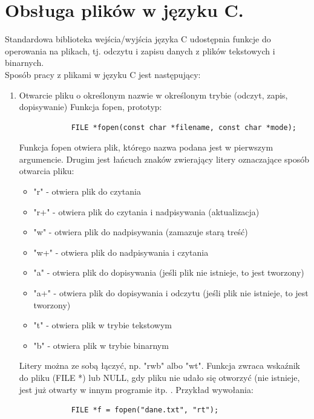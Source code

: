 \documentclass[12pt]{article}
\begin{document}
    \newpage

    \section{Obsługa plików w języku C.}

    Standardowa biblioteka wejścia/wyjścia języka C udostępnia funkcje do operowania na plikach, tj.
    odczytu i zapisu danych z plików tekstowych i binarnych.\\

    Sposób pracy z plikami w języku C jest następujący:
    \begin{enumerate}
        \item Otwarcie pliku o określonym nazwie w określonym trybie (odczyt, zapis, dopisywanie)
        Funkcja fopen, prototyp:
        \begin{verbatim}
            FILE *fopen(const char *filename, const char *mode);
        \end{verbatim}
        Funkcja fopen otwiera plik, którego nazwa podana jest w pierwszym argumencie. Drugim jest
        łańcuch znaków zwierający litery oznaczające sposób otwarcia pliku:
        \begin{itemize}
            \item "r" - otwiera plik do czytania
            \item "r+" - otwiera plik do czytania i nadpisywania (aktualizacja)
            \item "w" - otwiera plik do nadpisywania (zamazuje starą treść)
            \item "w+" - otwiera plik do nadpisywania i czytania
            \item "a" - otwiera plik do dopisywania (jeśli plik nie istnieje, to jest tworzony)
            \item "a+" - otwiera plik do dopisywania i odczytu (jeśli plik nie istnieje, to jest tworzony)
            \item "t" - otwiera plik w trybie tekstowym
            \item "b" - otwiera plik w trybie binarnym
        \end{itemize}

        Litery można ze sobą łączyć, np. "rwb" albo "wt".
        Funkcja zwraca wskaźnik do pliku (FILE *) lub NULL, gdy pliku nie udało się otworzyć (nie
        istnieje, jest już otwarty w innym programie itp. .
        Przykład wywołania:
        \begin{verbatim}
            FILE *f = fopen("dane.txt", "rt");
        \end{verbatim}




\end{enumerate}
\end{document}

